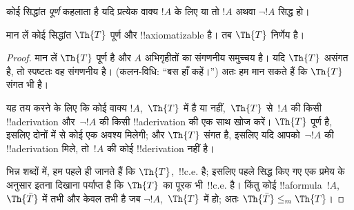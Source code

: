 \documentclass[../../../include/open-logic-section]{subfiles}
\begin{document}


कोई सिद्धांत {\em पूर्ण} कहलाता है यदि प्रत्येक वाक्य $!A$ के लिए या तो
$!A$ अथवा $\lnot !A$ सिद्ध हो।

\begin{lem}
मान लें कोई सिद्धांत $\Th{T}$ पूर्ण और !!{axiomatizable} है। तब $\Th{T}$
निर्णेय है।
\end{lem}

\begin{proof}
मान लें $\Th{T}$ पूर्ण है और $A$ अभिगृहीतों का संगणनीय समुच्चय है। यदि
$\Th{T}$ असंगत है, तो स्पष्टतः वह संगणनीय है। (कलन-विधि: ``बस हाँ कहें।'')
अतः हम मान सकते हैं कि $\Th{T}$ संगत भी है।

यह तय करने के लिए कि कोई वाक्य $!A$,~$\Th{T}$ में है या नहीं,~$\Th{T}$
से~$!A$ की किसी !!a{derivation} और~$\lnot !A$ की किसी !!a{derivation} की
एक साथ खोज करें। $\Th{T}$ पूर्ण है, इसलिए दोनों में से कोई एक अवश्य
मिलेगी; और $\Th{T}$ संगत है, इसलिए यदि आपको~$\lnot !A$ की
!!a{derivation} मिले, तो~$!A$ की कोई !!{derivation} नहीं है।

भिन्न शब्दों में, हम पहले ही जानते हैं कि $\Th{T}$,~!!{c.e.} है; इसलिए
पहले सिद्ध किए गए एक प्रमेय के अनुसार इतना दिखाना पर्याप्त है कि
$\Th{T}$ का पूरक भी~!!{c.e.} है। किंतु कोई !!a{formula}~$!A$,
$\Th{\bar T}$ में तभी और केवल तभी है जब $\lnot !A$,~$\Th{T}$ में हो;
अतः $\Th{\bar T} \leq_m \Th{T}$।
\end{proof}
\end{document}

